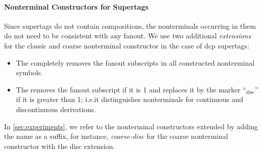 \documentclass[../../document.tex]{subfiles}
\begin{document}
    \paragraph{Nonterminal Constructors for  Supertags}
    Since  supertags do not contain  compositions, the nonterminals occurring in them do not need to be consistent with any fanout.
    We use two additional \emph{extensions} for the classic and coarse nonterminal constructor in the case of dcp supertags:
    \begin{itemize}
        \item The  completely removes the fanout subscripts in all constructed nonterminal symbols.
        \item The  removes the fanout subscript if it is 1 and replaces it by the marker ``$_{\text{disc}}$'' if it is greater than 1; i.e.\@ it distinguishes nonterminals for continuous and discontinuous derivations.
    \end{itemize}
    In \cref{sec:experiments}, we refer to the nonterminal constructors extended by adding the name as a suffix, for instance, \emph{coarse-disc} for the coarse nonterminal constructor with the disc extension.
\end{document}
